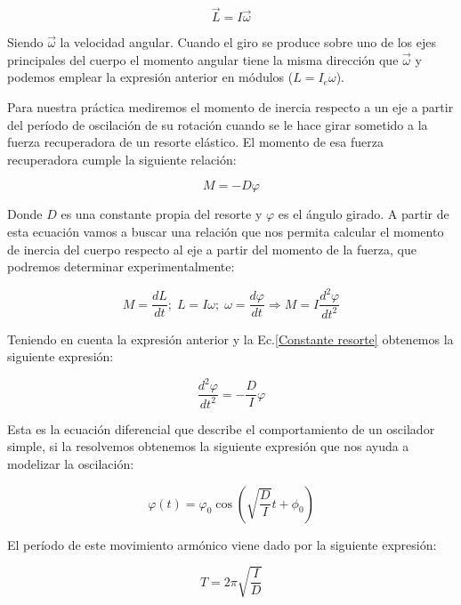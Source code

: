 \documentclass[a4paper,12pt,titlepage]{report}
\begin{document}
\begin{equation}
    \vec{L} = I \vec{\omega}
\end{equation}

Siendo $\vec{\omega}$ la velocidad angular. Cuando el giro se produce sobre uno de los ejes principales del cuerpo el momento angular tiene la misma dirección que $\vec{\omega}$ y podemos emplear la expresión anterior en módulos ($L=I_e\omega$).

\par Para nuestra práctica mediremos el momento de inercia respecto a un eje a partir del período de oscilación de su rotación cuando se le hace girar sometido a la fuerza recuperadora de un resorte elástico. El momento de esa fuerza recuperadora cumple la siguiente relación:

\begin{equation}
    M = -D\varphi
    \label{Constante resorte}
\end{equation}

Donde $D$ es una constante propia del resorte y $\varphi$ es el ángulo girado. A partir de esta ecuación vamos a buscar una relación que nos permita calcular el momento de inercia del cuerpo respecto al eje a partir del momento de la fuerza, que podremos determinar experimentalmente:

\begin{equation}
    M = \frac{dL}{dt};\; L=I\omega;\; \omega = \frac{d\varphi}{dt} \Rightarrow M = I \frac{d^2\varphi}{dt^2}
\end{equation}

Teniendo en cuenta la expresión anterior y la Ec.\ref{Constante resorte} obtenemos la siguiente expresión:

\begin{equation}
    \frac{d^2\varphi}{dt^2} = -\frac{D}{I}\varphi
\end{equation}

Esta es la ecuación diferencial que describe el comportamiento de un oscilador simple, si la resolvemos obtenemos la siguiente expresión que nos ayuda a modelizar la oscilación:

\begin{equation}
    \varphi(t) = \varphi_0 \cos\left (\sqrt{\frac{D}{I}}t+\phi_0\right ) 
\end{equation}

El período de este movimiento armónico viene dado por la siguiente expresión:

\begin{equation}
    T = 2\pi\sqrt{\frac{I}{D}}
    \label{Periodo oscilacion}
\end{equation}
\end{document}
